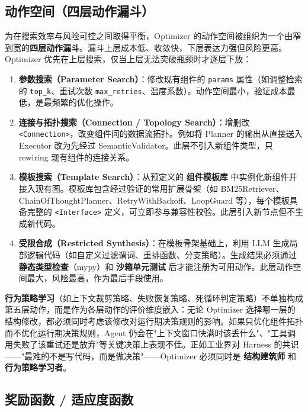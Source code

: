 \subsection{动作空间（四层动作漏斗）}

为在搜索效率与风险可控之间取得平衡，Optimizer 的动作空间被组织为一个由窄到宽的\textbf{四层动作漏斗}。漏斗上层成本低、收敛快，下层表达力强但风险更高。Optimizer 优先在上层搜索，仅当上层无法突破瓶颈时才逐层下放：

\begin{enumerate}
    \item \textbf{参数搜索（Parameter Search）}：修改现有组件的 \texttt{params} 属性（如调整检索的 \texttt{top\_k}、重试次数 \texttt{max\_retries}、温度系数）。动作空间最小，验证成本最低，是最频繁的优化操作。
    \item \textbf{连接与拓扑搜索（Connection / Topology Search）}：增删改 \texttt{<Connection>}，改变组件间的数据流拓扑。例如将 Planner 的输出从直接送入 Executor 改为先经过 SemanticValidator。此层不引入新组件类型，只 rewiring 现有组件的连接关系。
    \item \textbf{模板搜索（Template Search）}：从预定义的 \textbf{组件模板库} 中实例化新组件并接入现有图。模板库包含经过验证的常用扩展骨架（如 BM25Retriever、ChainOfThoughtPlanner、RetryWithBackoff、LoopGuard 等），每个模板具备完整的 \texttt{<Interface>} 定义，可立即参与兼容性校验。此层引入新节点但不生成新代码。
    \item \textbf{受限合成（Restricted Synthesis）}：在模板骨架基础上，利用 LLM 生成局部逻辑代码（如自定义过滤谓词、重排函数、分支策略）。生成结果必须通过 \textbf{静态类型检查}（mypy）和 \textbf{沙箱单元测试} 后才能注册为可用动作。此层动作空间最大，风险最高，作为最后手段使用。
\end{enumerate}

\textbf{行为策略学习}（如上下文裁剪策略、失败恢复策略、死循环判定策略）不单独构成第五层动作，而是作为各层动作的评价维度嵌入：无论 Optimizer 选择哪一层的结构修改，都必须同时考虑该修改对运行期决策规则的影响。如果只优化组件拓扑而不优化运行期决策规则，Agent 仍会在"上下文窗口快满时该丢什么"、"工具调用失败了该重试还是放弃"等关键决策上表现不佳。正如工业界对 Harness 的共识——"最难的不是写代码，而是做决策"——Optimizer 必须同时是 \textbf{结构建筑师} 和 \textbf{行为策略学习者}。

\subsection{奖励函数 / 适应度函数}

